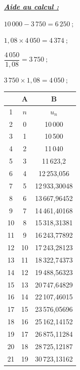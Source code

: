 \documentclass[10pt]{article}
\begin{document}
\begin{enumerate}
\begin{minipage}[t]{0.6\textwidth}
\medskip

\underline{\textit{\textbf{Aide au calcul :}}}

$10\,000 - 3\,750 = 6\,250~;$

\smallskip

$1,08 \times 4\,050 = 4\,374~;$

\smallskip

$\dfrac{4\,050}{1,08} = 3\,750~;$

\smallskip

$3\,750 \times 1,08 = 4\,050~;$
\end{minipage}
\hfill
\begin{minipage}[t]{0.35\textwidth}
\vspace{0pt}
\begin{center}
\begin{tabular}{|c|c|c|}
\hline
\rowcolor{gray!20}
 & A & B \\
\hline
\cellcolor{gray!20}1 & $n$ & $u_n$ \\
\hline
\cellcolor{gray!20}2 & 0 & 10\,000 \\
\hline
\cellcolor{gray!20}3 & 1 & 10\,500 \\
\hline
\cellcolor{gray!20}4 & 2 & 11\,040 \\
\hline
\cellcolor{gray!20}5 & 3 & 11\,623,2 \\
\hline
\cellcolor{gray!20}6 & 4 & 12\,253,056 \\
\hline
\cellcolor{gray!20}7 & 5 & 12\,933,30048 \\
\hline
\cellcolor{gray!20}8 & 6 & 13\,667,96452 \\
\hline
\cellcolor{gray!20}9 & 7 & 14\,461,40168 \\
\hline
\cellcolor{gray!20}10 & 8 & 15\,318,31381 \\
\hline
\cellcolor{gray!20}11 & 9 & 16\,243,77892 \\
\hline
\cellcolor{gray!20}12 & 10 & 17\,243,28123 \\
\hline
\cellcolor{gray!20}13 & 11 & 18\,322,74373 \\
\hline
\cellcolor{gray!20}14 & 12 & 19\,488,56323 \\
\hline
\cellcolor{gray!20}15 & 13 & 20\,747,64829 \\
\hline
\cellcolor{gray!20}16 & 14 & 22\,107,46015 \\
\hline
\cellcolor{gray!20}17 & 15 & 23\,576,05696 \\
\hline
\cellcolor{gray!20}18 & 16 & 25\,162,14152 \\
\hline
\cellcolor{gray!20}19 & 17 & 26\,875,11284 \\
\hline
\cellcolor{gray!20}20 & 18 & 28\,725,12187 \\
\hline
\cellcolor{gray!20}21 & 19 & 30\,723,13162 \\
\hline
\end{tabular}
\end{center}
\end{minipage}
\end{enumerate}
\end{document}
